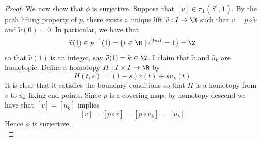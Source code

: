 \documentclass[a4paper]{article}
\begin{document}
\begin{thm}{}{}
\begin{proof}
We now show that $\phi$ is surjective. Suppose that $[v]\in\pi_1(S^1,1)$. By the path lifting property of $p$, there exists a unique lift $\widetilde{v}:I\to\R$ such that $v=p\circ\widetilde{v}$ and $\widetilde{v}(0)=0$. In particular, we have that $$\widetilde{v}(1)\in p^{-1}(1)=\{t\in\R\;|\;e^{2\pi it}=1\}=\Z$$ so that $\widetilde{v}(1)$ is an integer, say $\widetilde{v}(1)=k\in\Z$. I claim that $\widetilde{v}$ and $\widetilde{u_k}$ are homotopic. Define a homotopy $H:I\times I\to\R$ by $$H(t,s)=(1-s)\widetilde{v}(t)+s\widetilde{u_k}(t)$$ It is clear that it satisfies the boundary conditions so that $H$ is a homotopy from $\widetilde{v}$ to $\widetilde{u_k}$ fixing end points. Since $p$ is a covering map, by homotopy descend we have that $[\widetilde{v}]=[\widetilde{u_k}]$ implies $$[v]=[p\circ\widetilde{v}]=[p\circ\widetilde{u_k}]=[u_k]$$ Hence $\phi$ is surjective. \\


\end{proof}
\end{thm}
\end{document}
